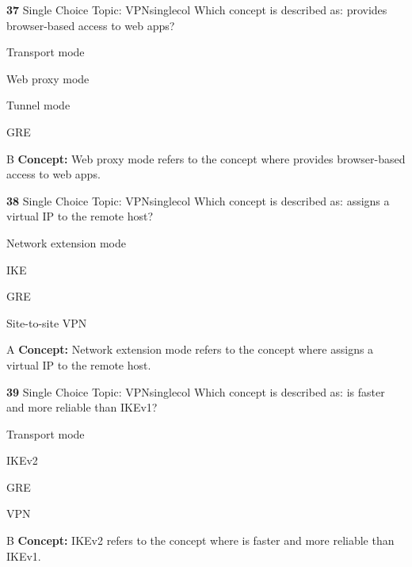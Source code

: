 \documentclass[10pt,a4paper]{article}
\begin{document}
\begin{qcard}{\color{white}\textbf{37} \hfill \small Single Choice \textbar{} Topic: VPN}{singlecol}
Which concept is described as: provides browser-based access to web apps?

\begin{qoptions}
\item Transport mode
\item Web proxy mode
\item Tunnel mode
\item GRE
\end{qoptions}
\begin{explainbox}{B}
\textbf{Concept:} Web proxy mode refers to the concept where provides browser-based access to web apps.
\end{explainbox}
\end{qcard}

\begin{qcard}{\color{white}\textbf{38} \hfill \small Single Choice \textbar{} Topic: VPN}{singlecol}
Which concept is described as: assigns a virtual IP to the remote host?

\begin{qoptions}
\item Network extension mode
\item IKE
\item GRE
\item Site-to-site VPN
\end{qoptions}
\begin{explainbox}{A}
\textbf{Concept:} Network extension mode refers to the concept where assigns a virtual IP to the remote host.
\end{explainbox}
\end{qcard}

\begin{qcard}{\color{white}\textbf{39} \hfill \small Single Choice \textbar{} Topic: VPN}{singlecol}
Which concept is described as: is faster and more reliable than IKEv1?

\begin{qoptions}
\item Transport mode
\item IKEv2
\item GRE
\item VPN
\end{qoptions}
\begin{explainbox}{B}
\textbf{Concept:} IKEv2 refers to the concept where is faster and more reliable than IKEv1.
\end{explainbox}
\end{qcard}
\end{document}
